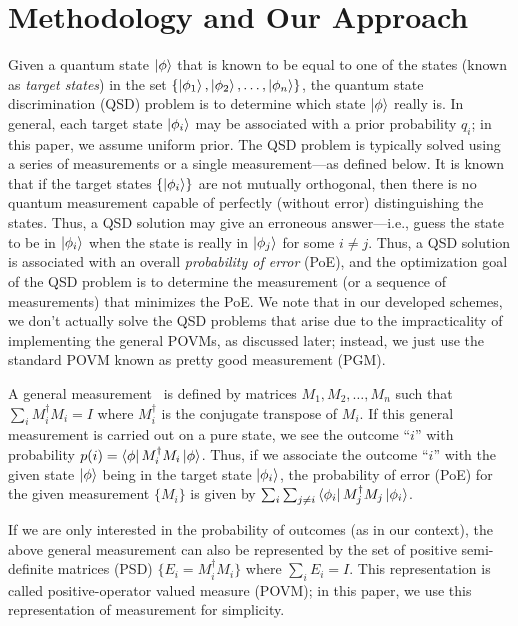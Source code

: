 \section{Methodology and Our Approach}
\label{sec:povm}


Given a quantum state $\ket{\phi}$ that is known to be equal to one of the 
states (known as \emph{target states}) in the set 
$\{\ket{\phi_1}, \ket{\phi_2}, \ldots, \ket{\phi_n} \}$,
the quantum state discrimination (QSD) problem 
is to determine which state $\ket{\phi}$ really is.
In general, each target state $\ket{\phi_i}$ may be associated with
a prior probability $q_i$; in this paper, we assume uniform
prior.
The QSD problem is typically solved using a series of measurements or 
a single measurement---as defined below.
It is known that if the target states $\{\ket{\phi_i}\}$  are not mutually orthogonal, 
then there is no quantum measurement capable of perfectly (without error)
distinguishing the states.
Thus, a QSD solution may give an erroneous answer---i.e., guess the
state to be in $\ket{\phi_i}$ when the state is really in $\ket{\phi_j}$ for 
some $i \neq j$. Thus, a QSD solution is associated with an overall {\em probability
of error} (PoE), and the optimization goal of the QSD problem is to determine the
measurement (or a sequence of measurements) that minimizes the PoE. 
We note that in our developed schemes, we don't actually solve the QSD 
problems that
arise due to the impracticality of implementing the general POVMs, as discussed
later; instead,
we just use the standard POVM known as pretty good measurement (PGM).

A general measurement~\cite{qcqi-book} is defined by matrices $M_1, M_2, \ldots, M_n$ such that
$\sum_i M_i^{\dagger}M_i = I$ where $M_i^{\dagger}$ is the conjugate transpose of
$M_i$. If this general measurement is carried out on a pure state,
we see the outcome ``$i$'' with 
probability $p(i) = \bra{\phi}M_i^{\dagger}M_i\ket{\phi}$. Thus, if we associate
the outcome ``$i$'' with the given state $\ket{\phi}$ being in the target state 
$\ket{\phi_i}$, the probability of error (PoE) for the given measurement $\{M_i\}$
is given by $\sum_i \sum_{j \neq i} \bra{\phi_i}M_j^{\dagger}M_j\ket{\phi_i}$.

If we are only interested in the probability of outcomes (as in our context), the above
general measurement can also be represented by the set of positive semi-definite 
matrices (PSD) $\{E_i = M_i^{\dagger}M_i\}$ where $\sum_{i} E_i = I$. This representation 
is called positive-operator valued measure (POVM); in this paper, we use this 
representation of measurement for simplicity. 

